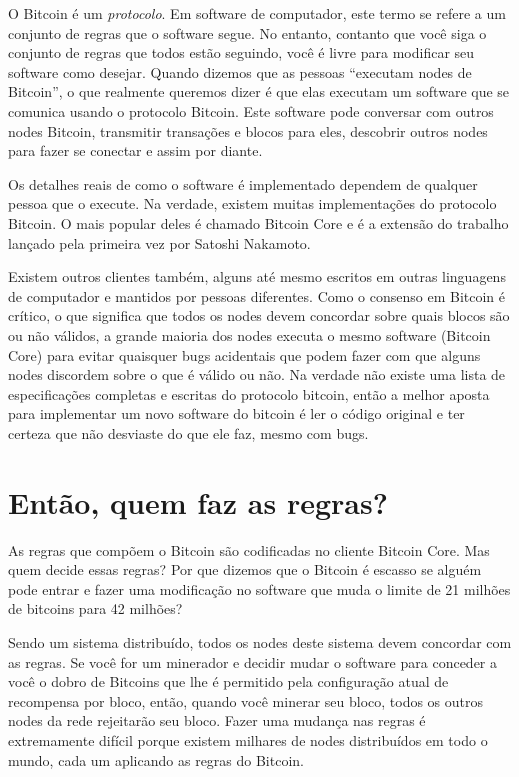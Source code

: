 O Bitcoin é um \textit{protocolo}.
Em software de computador, este termo se refere a um conjunto de regras que o software segue.
No entanto, contanto que você siga o conjunto de regras que todos estão seguindo, você é livre para modificar seu software como desejar.
Quando dizemos que as pessoas “executam nodes de Bitcoin”, o que realmente queremos dizer é que elas executam um software que se comunica usando o protocolo Bitcoin.
Este software pode conversar com outros nodes Bitcoin, transmitir transações e blocos para eles, descobrir outros nodes para fazer se conectar e assim por diante.

Os detalhes reais de como o software é implementado dependem de qualquer pessoa que o execute.
Na verdade, existem muitas implementações do protocolo Bitcoin.
O mais popular deles é chamado Bitcoin Core e é a extensão do trabalho lançado pela primeira vez por Satoshi Nakamoto.

Existem outros clientes também, alguns até mesmo escritos em outras linguagens de computador e mantidos por pessoas diferentes. 
Como o consenso em Bitcoin é crítico, o que significa que todos os nodes devem concordar sobre quais blocos são ou não válidos, a grande maioria dos nodes executa o mesmo software (Bitcoin Core) para evitar quaisquer bugs acidentais que podem fazer com que alguns nodes discordem sobre o que é válido ou não.
Na verdade não existe uma lista de especificações completas e escritas do protocolo bitcoin, então a melhor aposta para implementar um novo software do bitcoin é ler o código original e ter certeza que não desviaste do que ele faz, mesmo com bugs.

\section*{Então, quem faz as regras?}

As regras que compõem o Bitcoin são codificadas no cliente Bitcoin Core. Mas quem decide essas regras? Por que dizemos que o Bitcoin é escasso se alguém pode entrar e fazer uma modificação no software que muda o limite de 21 milhões de bitcoins para 42 milhões?

Sendo um sistema distribuído, todos os nodes deste sistema devem concordar com as regras.
Se você for um minerador e decidir mudar o software para conceder a você o dobro de Bitcoins que lhe é permitido pela configuração atual de recompensa por bloco, então, quando você minerar seu bloco, todos os outros nodes da rede rejeitarão seu bloco. 
Fazer uma mudança nas regras é extremamente difícil porque existem milhares de nodes distribuídos em todo o mundo, cada um aplicando as regras do Bitcoin.

